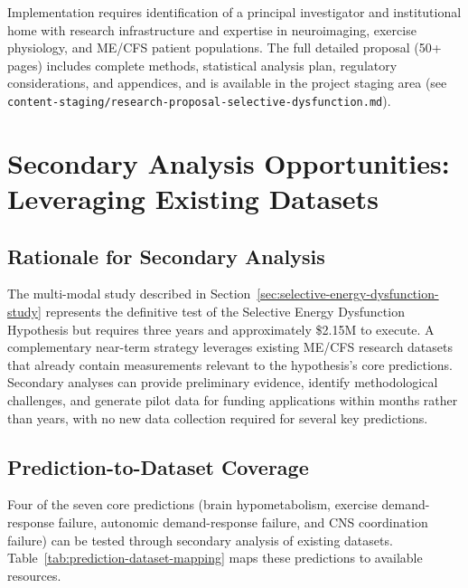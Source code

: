 Implementation requires identification of a principal investigator and institutional home with research infrastructure and expertise in neuroimaging, exercise physiology, and ME/CFS patient populations. The full detailed proposal (50+ pages) includes complete methods, statistical analysis plan, regulatory considerations, and appendices, and is available in the project staging area (see \texttt{content-staging/research-proposal-selective-dysfunction.md}).

\section{Secondary Analysis Opportunities: Leveraging Existing Datasets}
\label{sec:secondary-analysis-opportunities}

\subsection{Rationale for Secondary Analysis}

The multi-modal study described in Section~\ref{sec:selective-energy-dysfunction-study}
represents the definitive test of the Selective Energy Dysfunction Hypothesis but requires
three years and approximately \$2.15M to execute. A complementary near-term strategy
leverages existing ME/CFS research datasets that already contain measurements relevant to
the hypothesis's core predictions. Secondary analyses can provide preliminary evidence,
identify methodological challenges, and generate pilot data for funding applications
within months rather than years, with no new data collection required for several key
predictions.

\subsection{Prediction-to-Dataset Coverage}

Four of the seven core predictions (brain hypometabolism, exercise demand-response
failure, autonomic demand-response failure, and CNS coordination failure) can be
tested through secondary analysis of existing datasets.
Table~\ref{tab:prediction-dataset-mapping} maps these predictions to available
resources.

